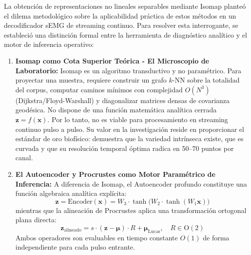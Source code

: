 \documentclass[11pt,a4paper]{article}
\begin{document}
La obtención de representaciones no lineales separables mediante Isomap planteó el dilema metodológico sobre la aplicabilidad práctica de estos métodos en un decodificador sEMG de streaming continuo. Para resolver esta interrogante, se estableció una distinción formal entre la herramienta de diagnóstico analítico y el motor de inferencia operativo:
\begin{enumerate}
    \item \textbf{Isomap como Cota Superior Teórica - El Microscopio de Laboratorio:}
    Isomap es un algoritmo transductivo y no paramétrico. Para proyectar una muestra, requiere construir un grafo $k$-NN sobre la totalidad del corpus, computar caminos mínimos con complejidad $O(N^3)$ (Dijkstra/Floyd-Warshall) y diagonalizar matrices densas de covarianza geodésica. No dispone de una función matemática analítica cerrada $\mathbf{z} = f(\mathbf{x})$. Por lo tanto, no es viable para procesamiento en streaming continuo pulso a pulso. Su valor en la investigación reside en proporcionar el estándar de oro biofísico: demuestra que la variedad intrínseca existe, que es curvada y que su resolución temporal óptima radica en 50--70 puntos por canal.
    \item \textbf{El Autoencoder y Procrustes como Motor Paramétrico de Inferencia:}
    A diferencia de Isomap, el Autoencoder profundo constituye una función algebraica analítica explícita:
    \begin{equation}
        \mathbf{z} = \text{Encoder}(\mathbf{x}) = W_3 \cdot \tanh\big(W_2 \cdot \tanh(W_1 \mathbf{x})\big)
    \end{equation}
    mientras que la alineación de Procrustes aplica una transformación ortogonal plana directa:
    \begin{equation}
        \mathbf{z}_{\text{alineado}} = s \cdot (\mathbf{z} - \boldsymbol{\mu}) \cdot R + \boldsymbol{\mu}_{\text{Lucas}}, \quad R \in \text{O}(2)
    \end{equation}
    Ambos operadores son evaluables en tiempo constante $O(1)$ de forma independiente para cada pulso entrante.
\end{enumerate}
\end{document}
